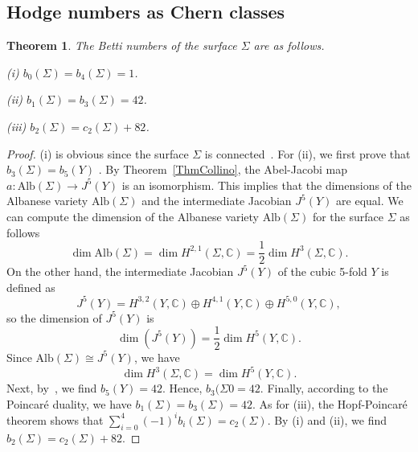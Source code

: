 \documentclass{article}
\newtheorem{theorem}{Theorem}[section]
\theoremstyle{definition}
\begin{document}

\subsection{Hodge numbers as Chern classes}

\begin{theorem}\label{3.18}
    The Betti numbers of the surface $\Sigma$ are as follows.

    (i) $b_0(\Sigma) = b_4(\Sigma) = 1$.
    
    (ii) $b_1(\Sigma) = b_3(\Sigma) = 42$.
    
    (iii) $b_2(\Sigma) = c_2(\Sigma) + 82$.
\end{theorem}
\begin{proof}
    (i) is obvious since the surface $\Sigma$ is connected~\cite[Théorème 2.1 (c)]{DM}. 
 For (ii), we first prove that $b_3(\Sigma) = b_5(Y)$ . 
    By Theorem~\ref{ThmCollino}, the Abel-Jacobi map \( a: \text{Alb}(\Sigma) \to J^5(Y) \) is an isomorphism. This implies that the dimensions of the Albanese variety \( \text{Alb}(\Sigma) \) and the intermediate Jacobian \( J^5(Y) \) are equal. We can compute the dimension of the Albanese variety \( \text{Alb}(\Sigma) \) for the surface \( \Sigma \) as follows
\[
\dim\text{Alb}(\Sigma) = \dim H^{2,1}(\Sigma, \mathbb{C}) = \frac{1}{2}\dim H^3(\Sigma, \mathbb{C}).
\]
On the other hand, the intermediate Jacobian \(J^5(Y) \) of the cubic 5-fold \( Y \) is defined as
\[
J^5(Y) = H^{3,2}(Y, \mathbb{C}) \oplus H^{4,1}(Y, \mathbb{C}) \oplus H^{5,0}(Y, \mathbb{C}),
\]
so the dimension of \( J^5(Y) \) is
\[
\dim(J^5(Y)) = \frac{1}{2} \dim H^5(Y, \mathbb{C}).
\]
Since \( \text{Alb}(\Sigma) \cong J^5(Y) \), we have
\[
\dim H^3(\Sigma, \mathbb{C}) = \dim H^5(Y, \mathbb{C}).
\]
Next, by~\cite[Corollary 1.12]{HuybrechtsCubic}, we find $b_5(Y) = 42$. Hence, $b_3(\Sigma0 = 42$.
    Finally, according to the Poincaré duality, we have $b_1(\Sigma) = b_3(\Sigma) = 42$. As for (iii), the Hopf-Poincaré theorem shows that $\sum_{i = 0}^4 (-1)^i b_i(\Sigma) = c_2(\Sigma)$. By (i) and (ii), we find $b_2(\Sigma) = c_2(\Sigma) + 82$.
\end{proof}
\end{document}
